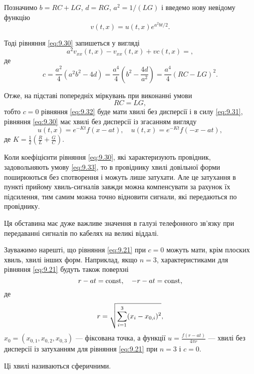 \begin{solution}
    Позначимо $b = RC + LG$, $d = RG$, $a^2 = 1 / (LG)$ і введемо нову невідому функцію
    \begin{equation}
        \label{eq:9.31}
        v(t,x) = u(t,x) e^{a^2bt/2}.
    \end{equation}
    
    Тоді рівняння \eqref{eq:9.30} запишеться у вигляді
    \begin{equation}
        \label{eq:9.32}
        a^2 v_{xx}(t,x)-v_{xx}(t,x)+vc(t,x)=,
    \end{equation}
    де
    \begin{equation}
        c = \frac{a^2}{4} (a^2b^2-4d) = \frac{a^4}{4}\left(b^2-\frac{4d}{a^2}\right) = \frac{a^4}{4}(RC-LG)^2.
    \end{equation}

    Отже, на підставі попередніх міркувань при виконанні умови 
    \begin{equation}
        \label{eq:9.33}
        RC = LG,
    \end{equation}
    тобто $c = 0$ рівняння \eqref{eq:9.32} буде мати хвилі без дисперсії і в силу \eqref{eq:9.31}, рівняння \eqref{eq:9.30} має хвилі без дисперсії із згасанням вигляду
    \begin{equation}
        u(t,x)=e^{-Kt}f(x-at), \quad u(t,x)=e^{-Kt}f(-x-at),
    \end{equation}
    де $K = \frac{1}{2} \left( \frac{R}{L} + \frac{G}{C} \right)$. \medskip

    Коли коефіцієнти рівняння \eqref{eq:9.30}, які характеризують провідник, задовольняють умову \eqref{eq:9.33}, то в провіднику хвилі довільної форми поширюються без спотворення і можуть лише затухати. Але це затухання в пункті прийому хвиль-сигналів завжди можна компенсувати за рахунок їх підсилення, тим самим можна точно відновити сигнали, які передаються по провіднику. \medskip

    Ця обставина має дуже важливе значення в галузі телефонного зв'язку при передаванні сигналів по кабелях на великі віддалі.
\end{solution}

Зауважимо нарешті, що рівняння \eqref{eq:9.21} при $c = 0$ можуть мати, крім плоских хвиль, хвилі інших форм. Наприклад, якщо $n = 3$, характеристиками для рівняння \eqref{eq:9.21} будуть також поверхні
\begin{equation}
    r - at = \operatorname{const}, \quad - r - a t = \operatorname{const},
\end{equation}
де 
\begin{equation}
    r = \sqrt{\displaystyle\sum\limits_{i=1}^3 (x_i - x_{0,i})^2},
\end{equation}
$x_0 = (x_{0, 1}, x_{0, 2}, x_{0, 3})$ --- фіксована точка, а функції $u = \frac{f(r - at)}{4 \pi r}$ --- хвилі без дисперсії із затуханням для рівняння \eqref{eq:9.21} при $n = 3$ і $c = 0$.

\begin{definition}
    Ці хвилі називаються сферичними.
\end{definition}